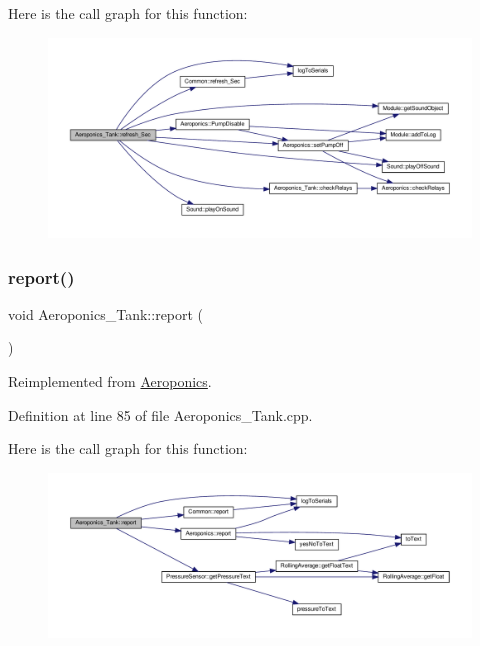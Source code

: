Here is the call graph for this function\+:
\nopagebreak
\begin{figure}[H]
\begin{center}
\leavevmode
\includegraphics[width=350pt]{class_aeroponics___tank_a9b1c9377aec2a453e4562bca5ae7afa2_cgraph}
\end{center}
\end{figure}
\mbox{\label{class_aeroponics___tank_a45e50ca4e5d5a605d355d65c8cd3e5cd}} 
\subsubsection{\texorpdfstring{report()}{report()}\hspace{0.1cm}{\footnotesize\ttfamily [1/2]}}
{\footnotesize\ttfamily void Aeroponics\+\_\+\+Tank\+::report (\begin{DoxyParamCaption}{ }\end{DoxyParamCaption})\hspace{0.3cm}{\ttfamily [virtual]}}



Reimplemented from \hyperlink{class_aeroponics_a3dbfce027ab5fa736a6007a6ae75ee4e}{Aeroponics}.



Definition at line 85 of file Aeroponics\+\_\+\+Tank.\+cpp.

Here is the call graph for this function\+:
\nopagebreak
\begin{figure}[H]
\begin{center}
\leavevmode
\includegraphics[width=350pt]{class_aeroponics___tank_a45e50ca4e5d5a605d355d65c8cd3e5cd_cgraph}
\end{center}
\end{figure}
\mbox{\label{class_aeroponics___tank_a45e50ca4e5d5a605d355d65c8cd3e5cd}} 
